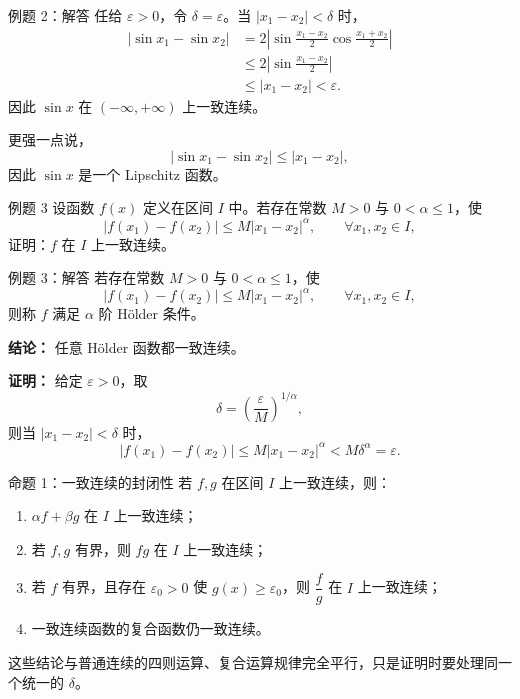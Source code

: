 ﻿\documentclass[aspectratio=169,11pt]{ctexbeamer}
\begin{document}
\begin{frame}{例题 2：解答}
任给 $\varepsilon>0$，令 $\delta=\varepsilon$。当 $|x_1-x_2|<\delta$ 时，
\begin{align*}
  |\sin x_1-\sin x_2|
  &=2\left|\sin\frac{x_1-x_2}{2}\cos\frac{x_1+x_2}{2}\right|\\
  &\le 2\left|\sin\frac{x_1-x_2}{2}\right|\\
  &\le |x_1-x_2|<\varepsilon.
\end{align*}
因此 $\sin x$ 在 $(-\infty,+\infty)$ 上一致连续。
\vspace{0.5em}

更强一点说，
\[
  |\sin x_1-\sin x_2|\le |x_1-x_2|,
\]
因此 $\sin x$ 是一个 Lipschitz 函数。
\end{frame}

\begin{frame}{例题 3}
设函数 $f(x)$ 定义在区间 $I$ 中。若存在常数 $M>0$ 与 $0<\alpha\le 1$，使
\[
  |f(x_1)-f(x_2)|\le M|x_1-x_2|^\alpha,\qquad \forall x_1,x_2\in I,
\]
证明：$f$ 在 $I$ 上一致连续。
\end{frame}

\begin{frame}{例题 3：解答}
若存在常数 $M>0$ 与 $0<\alpha\le 1$，使
\[
  |f(x_1)-f(x_2)|\le M|x_1-x_2|^\alpha,\qquad \forall x_1,x_2\in I,
\]
则称 $f$ 满足 $\alpha$ 阶 H\"older 条件。
\vspace{0.5em}

\textbf{结论：} 任意 H\"older 函数都一致连续。
\vspace{0.5em}

\textbf{证明：} 给定 $\varepsilon>0$，取
\[
  \delta=\left(\frac{\varepsilon}{M}\right)^{1/\alpha},
\]
则当 $|x_1-x_2|<\delta$ 时，
\[
  |f(x_1)-f(x_2)|
  \le M|x_1-x_2|^\alpha
  < M\delta^\alpha
  =\varepsilon.
\]
\end{frame}

\begin{frame}{命题 1：一致连续的封闭性}
若 $f,g$ 在区间 $I$ 上一致连续，则：
\begin{enumerate}
  \item $\alpha f+\beta g$ 在 $I$ 上一致连续；
  \item 若 $f,g$ 有界，则 $fg$ 在 $I$ 上一致连续；
  \item 若 $f$ 有界，且存在 $\varepsilon_0>0$ 使 $g(x)\ge \varepsilon_0$，则 $\dfrac{f}{g}$ 在 $I$ 上一致连续；
  \item 一致连续函数的复合函数仍一致连续。
\end{enumerate}
\vspace{0.5em}
这些结论与普通连续的四则运算、复合运算规律完全平行，只是证明时要处理同一个统一的 $\delta$。
\end{frame}
\end{document}
